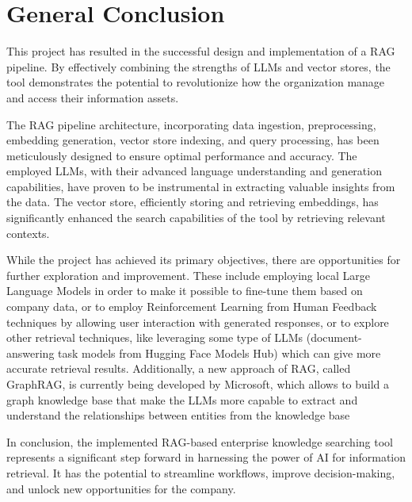 \chapter*{General Conclusion}

This project has resulted in the successful design and implementation of a RAG pipeline. By effectively combining the strengths of LLMs and vector stores, the tool demonstrates the potential to revolutionize how the organization manage and access their information assets.

The RAG pipeline architecture, incorporating data ingestion, preprocessing, embedding generation, vector store indexing, and query processing, has been meticulously designed to ensure optimal performance and accuracy. The employed LLMs, with their advanced language understanding and generation capabilities, have proven to be instrumental in extracting valuable insights from the data. The vector store, efficiently storing and retrieving embeddings, has significantly enhanced the search capabilities of the tool by retrieving relevant contexts.

While the project has achieved its primary objectives, there are opportunities for further exploration and improvement. These include employing local Large Language Models in order to make it possible to fine-tune them based on company data, or to employ Reinforcement Learning from Human Feedback techniques by allowing user interaction with generated responses, or to explore other retrieval techniques, like leveraging some type of LLMs (document-answering task models from Hugging Face Models Hub) which can give more accurate retrieval results. Additionally, a new approach of RAG, called GraphRAG, is currently being developed by Microsoft, which allows to build a graph knowledge base that make the LLMs more capable to extract and understand the relationships between entities from the knowledge base

In conclusion, the implemented RAG-based enterprise knowledge searching tool represents a significant step forward in harnessing the power of AI for information retrieval. It has the potential to streamline workflows, improve decision-making, and unlock new opportunities for the company.